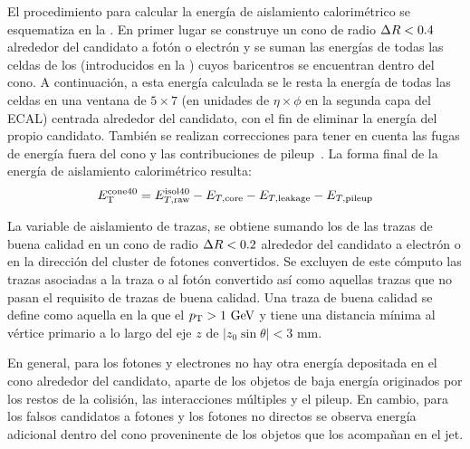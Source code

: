 El procedimiento para calcular la energía de aislamiento calorimétrico \etconefo se esquematiza en la \Fig{\ref{fig:objects:egamma:iso:iso_diagram}}. En primer lugar se construye un cono de radio \(\Delta R<0.4\) alrededor del candidato a fotón o electrón y se suman las energías de todas las celdas de los \topos (introducidos en la \Sect{\ref{subsec:objects:egamma:reco}}) cuyos baricentros se encuentran dentro del cono. A continuación, a esta energía calculada se le resta la energía de todas las celdas en una ventana de \(5\times 7\) (en unidades de \(\eta \times \phi\) en la segunda capa del \ac{ECAL}) centrada alrededor del candidato, con el fin de eliminar la energía del propio candidato.
También se realizan correcciones para tener en cuenta las fugas de energía fuera del cono y las contribuciones de pileup~\cite{PileupSubstraction}. La forma final de la energía de aislamiento calorimétrico resulta:
\begin{equation*}
    E_{\text{T}}^{\text{cone40}}  = E_{T,\text{raw}}^{\text{isol}40} - E_{T,\text{core}} - E_{T,\text{leakage}} - E_{T,\text{pileup}}
\end{equation*}


La variable de aislamiento de trazas, \ptconetw se obtiene sumando los \pt de las trazas de buena calidad en un cono de radio \(\Delta R<0.2\) alrededor del candidato a electrón o en la dirección del cluster de fotones convertidos.
Se excluyen de este cómputo las trazas asociadas a la traza o al fotón convertido así como aquellas trazas que no pasan el requisito de trazas de buena calidad. Una traza de buena calidad se define como aquella en la que el \(p_{\text{T}}>1~\text{GeV}\) y tiene una distancia mínima al vértice primario a lo largo del eje \(z\) de \(|z_0 \sin \theta| < 3\) mm.

En general, para los fotones y electrones no hay otra energía depositada en el cono alrededor del candidato, aparte de los objetos de baja energía originados por los restos de la colisión, las interacciones múltiples y el pileup. En cambio, para los falsos candidatos a fotones y los fotones no directos se observa energía adicional dentro del cono proveninente de los objetos que los acompañan en el jet.

